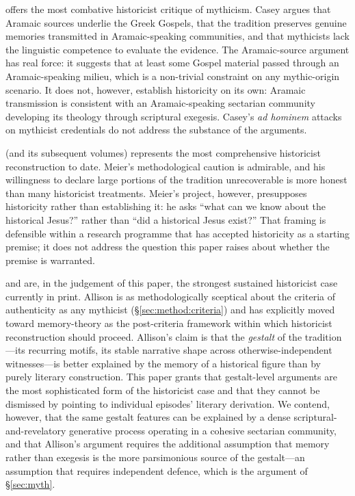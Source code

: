 \documentclass[12pt,oneside]{article}
\begin{document}
\citet{Casey2014} offers the most combative historicist critique of
mythicism.  Casey argues that Aramaic sources underlie the Greek
Gospels, that the tradition preserves genuine memories transmitted in
Aramaic-speaking communities, and that mythicists lack the linguistic
competence to evaluate the evidence.  The Aramaic-source argument has
real force: it suggests that at least some Gospel material passed
through an Aramaic-speaking milieu, which is a non-trivial constraint
on any mythic-origin scenario.  It does not, however, establish
historicity on its own: Aramaic transmission is consistent with an
Aramaic-speaking sectarian community developing its theology through
scriptural exegesis.  Casey's \textit{ad hominem} attacks on mythicist
credentials do not address the substance of the arguments.

\citet{Meier1991} (and its subsequent volumes) represents the most
comprehensive historicist reconstruction to date.  Meier's methodological
caution is admirable, and his willingness to declare large portions of
the tradition unrecoverable is more honest than many historicist
treatments.  Meier's project, however, presupposes historicity rather
than establishing it: he asks \enquote{what can we know about the
historical Jesus?} rather than \enquote{did a historical Jesus exist?}
That framing is defensible within a research programme that has
accepted historicity as a starting premise; it does not address the
question this paper raises about whether the premise is warranted.

\citet{Allison2010} and \citet{Allison2021} are, in the judgement of
this paper, the strongest sustained historicist case currently in
print.  Allison is as methodologically sceptical about the criteria
of authenticity as any mythicist (§\ref{sec:method:criteria}) and has
explicitly moved toward memory-theory as the post-criteria framework
within which historicist reconstruction should proceed.  Allison's
claim is that the \textit{gestalt} of the tradition---its recurring
motifs, its stable narrative shape across otherwise-independent
witnesses---is better explained by the memory of a historical figure
than by purely literary construction.  This paper grants that
gestalt-level arguments are the most sophisticated form of the
historicist case and that they cannot be dismissed by pointing to
individual episodes' literary derivation.  We contend, however, that
the same gestalt features can be explained by a dense scriptural-
and-revelatory generative process operating in a cohesive sectarian
community, and that Allison's argument requires the additional
assumption that memory rather than exegesis is the more parsimonious
source of the gestalt---an assumption that requires independent
defence, which is the argument of §\ref{sec:myth}.
\end{document}

